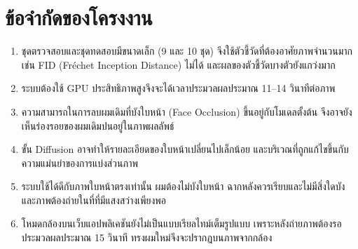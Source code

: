 \section{ข้อจำกัดของโครงงาน}
\begin{enumerate}
    \item ชุดตรวจสอบและชุดทดสอบมีขนาดเล็ก (9 และ 10 ชุด)
    จึงใช้ตัวชี้วัดที่ต้องอาศัยภาพจำนวนมาก เช่น FID (Fréchet Inception Distance) ไม่ได้
    และผลของตัวชี้วัดบางตัวยังแกว่งมาก
    \item ระบบต้องใช้ GPU ประสิทธิภาพสูงจึงจะได้เวลาประมวลผลประมาณ 11--14 วินาทีต่อภาพ
    \item ความสามารถในการลบผมเดิมที่บังใบหน้า (Face Occlusion) ขึ้นอยู่กับโมเดลตั้งต้น
    จึงอาจยังเห็นร่องรอยของผมเดิมปนอยู่ในภาพผลลัพธ์
    \item ขั้น Diffusion อาจทำให้รายละเอียดของใบหน้าเปลี่ยนไปเล็กน้อย
    และบริเวณที่ถูกแก้ไขขึ้นกับความแม่นยำของการแบ่งส่วนภาพ
    \item ระบบใช้ได้ดีกับภาพใบหน้าตรงเท่านั้น ผมต้องไม่บังใบหน้า
    ฉากหลังควรเรียบและไม่มีสิ่งใดบัง และภาพต้องถ่ายในที่ที่มีแสงสว่างเพียงพอ
    \item โหมดกล้องบนเว็บแอปพลิเคชันยังไม่เป็นแบบเรียลไทม์เต็มรูปแบบ
    เพราะหลังถ่ายภาพต้องรอประมวลผลประมาณ 15 วินาที ทรงผมใหม่จึงจะปรากฏบนภาพจากกล้อง
\end{enumerate}
